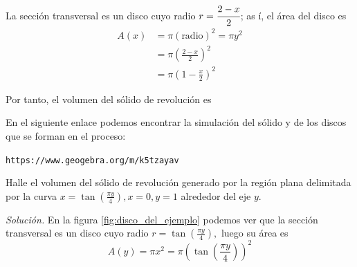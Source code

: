 La sección transversal es un disco cuyo radio {\small $r=\cfrac{2-x}{2}$;} as%
í, el área del disco es
{\small
\begin{align*}
 A(x)&=\pi (\text{radio})^{2}=\pi y^{2} \\
 & =\pi \left(\frac{2-x}{2}\right)^{2}\\
 &=\pi \left(1-\frac{x}{2}\right)^{2}
\end{align*}
}

Por tanto, el volumen del sólido de revolución es



En el siguiente enlace podemos encontrar la simulación del sólido y de los discos que se forman en el proceso:


\begin{center}
	\verb"https://www.geogebra.org/m/k5tzayav"
\end{center}


\begin{ejemplo} 
\textnormal{Halle el volumen del sólido de revolución generado por la región plana delimitada por la curva \textit{$x=\tan (\frac{\pi y}{4}),x=0,y=1$} alrededor del eje \textit{$y.$}}
\end{ejemplo}

\textit{Solución.} En la figura \ref{fig:disco_del_ejemplo} podemos ver que la sección transversal es un disco cuyo radio $r=\tan (\frac{\pi y}{4}),$ luego su área es
{\small
\[
A(y)=\pi x^{2}=\pi \left(\tan \left(\frac{\pi y}{4}\right)\right)^{2}
\]
}

